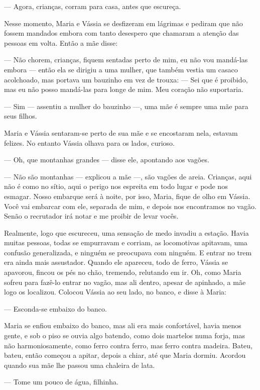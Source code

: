 --- Agora, crianças, corram para casa, antes que escureça.

Nesse momento, Maria e Vássia se desfizeram em lágrimas e pediram que
não fossem mandados embora com tanto desespero que chamaram a atenção
das pessoas em volta. Então a mãe disse:

--- Não chorem, crianças, fiquem sentadas perto de mim, eu não vou
mandá-las embora --- então ela se dirigiu a uma mulher, que também
vestia um casaco acolchoado, mas portava um bauzinho em vez de trouxa:
--- Sei que é proibido, mas eu não posso mandá-las para longe de mim.
Meu coração não suportaria.

--- Sim --- assentiu a mulher do bauzinho ---, uma mãe é sempre uma mãe
para seus filhos.

Maria e Vássia sentaram-se perto de sua mãe e se encostaram nela,
estavam felizes. No entanto Vássia olhava para os lados, curioso.

--- Oh, que montanhas grandes --- disse ele, apontando aos vagões.

--- Não são montanhas --- explicou a mãe ---, são vagões de areia.
Crianças, aqui não é como no sítio, aqui o perigo nos espreita em todo
lugar e pode nos esmagar. Nosso embarque será à noite, por isso, Maria,
fique de olho em Vássia. Você vai embarcar com ele, separada de mim, e
depois nos encontramos no vagão. Senão o recrutador irá notar e me
proibir de levar vocês.

Realmente, logo que escureceu, uma sensação de medo invadiu a estação.
Havia muitas pessoas, todas se empurravam e corriam, as locomotivas
apitavam, uma confusão generalizada, e ninguém se preocupava com
ninguém. E entrar no trem era ainda mais assustador. Quando ele
apareceu, todo de ferro, Vássia se apavorou, fincou os pés no chão,
tremendo, relutando em ir. Oh, como Maria sofreu para fazê-lo entrar no
vagão, mas ali dentro, apesar de apinhado, a mãe logo os localizou.
Colocou Vássia ao seu lado, no banco, e disse à Maria:

--- Esconda-se embaixo do banco.

Maria se enfiou embaixo do banco, mas ali era mais confortável, havia
menos gente, e sob o piso se ouvia algo batendo, como dois martelos numa
forja, mas não harmoniosamente, como ferro contra ferro, mas ferro
contra madeira. Bateu, bateu, então começou a apitar, depois a chiar,
até que Maria dormiu. Acordou quando sua mãe lhe passou uma chaleira de
lata.

--- Tome um pouco de água, filhinha.

